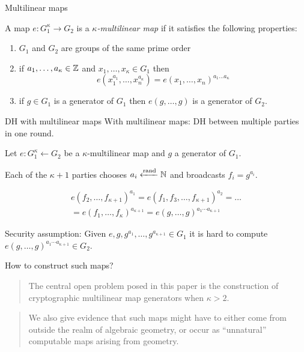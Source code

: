 \documentclass[english]{beamer}
\begin{document}
    \begin{frame}{Multilinear maps}
        \begin{definition}
            A map $e: G_1^\kappa \rightarrow G_2$ is a \emph{$\kappa$-multilinear map} if it satisfies the following properties:
            \begin{enumerate}
                \item $G_1$ and $G_2$ are groups of the same prime order
                \item if $a_1,\dots ,a_\kappa \in \mathbb{Z}$ and $x_1, \dots, x_\kappa \in G_1$ then
                    \begin{equation*}
                        e\left( x_1^{a_1}, \dots, x_n^{a_\kappa} \right) = e(x_1, \dots, x_n)^{a_1\dots a_\kappa}
                    \end{equation*}
                \item if $g \in G_1$ is a generator of $G_1$ then $e(g, \dots, g)$ is a generator of $G_2$.
            \end{enumerate}
        \end{definition}
    \end{frame}
    \begin{frame}{DH with multilinear maps}
        With multilinear maps: DH between multiple parties in one round.
        \pause

        Let $e: G_1^\kappa \leftarrow G_2$ be a $\kappa$-multilinear map and $g$ a generator of $G_1$.

        Each of the $\kappa+1$ parties chooses $a_i \xleftarrow{\mathrm{rand}} \mathbb{N}$ and broadcasts $f_i = g^{a_i}$.

        \begin{multline*}
            e(f_2, \dots, f_{\kappa+1})^{a_1} = e(f_1, f_3, \dots, f_{\kappa+1})^{a_2} = \dots \\
            = e(f_1, \dots, f_\kappa)^{a_{\kappa+1}} = e(g, \dots, g)^{a_1 \cdots a_{\kappa+1}}
        \end{multline*}

        \pause
        Security assumption: Given $e, g, g^{a_1}, \dots, g^{a_{\kappa+1}} \in G_1$ it is hard to compute $e(g, \dots, g)^{a_1 \cdots a_{\kappa+1}} \in G_2$.
    \end{frame}
    \begin{frame}{How to construct such maps?}
        \blockquote[][]{The central open problem posed in this paper is the construction of cryptographic multilinear map generators when $\kappa > 2$.}
        \pause

        \blockquote[][]{We also give evidence that such maps might have to either come from outside the realm of algebraic geometry, or occur as \enquote{unnatural} computable maps arising from geometry.}
    \end{frame}
\end{document}
